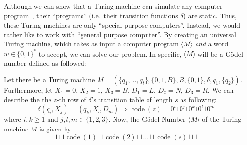\documentclass[journal]{IEEEtran}
\begin{document}

Although we can show that a Turing machine can simulate any computer program~\cite{Wegener2013:2.3}, their ``programs'' (i.e.~their transition functions $\delta$) are static. Thus, these Turing machines are only ``special purpose computers''. Instead, we would rather like to work with ``general purpose computer''. By creating an universal Turing machine, which takes as input a computer program $\langle M \rangle$ \textit{and} a word $w \in \{0, 1\}^*$ to accept, we can solve our problem. In specific, $\langle M \rangle$ will be a Gödel number defined as followed:

\begin{definition}
  Let there be a Turing machine $M = (\{q_1, \dotsc, q_t\}, \{0, 1, B\}, B, \{0, 1\}, \delta, q_1, \{q_2\})$. Furthermore, let $X_1 = 0$, $X_2 = 1$, $X_3 = B$, $D_1 = L$, $D_2 = N$, $D_3 = R$. We can describe the the $z$-th row of $\delta$'s transition table of length $s$ as following:
  \begin{equation*}
    \delta(q_i, X_j) = (q_k, X_l, D_m) \Longrightarrow \operatorname{code}(z) = 0^i 10^j 10^k 10^l 10^m
  \end{equation*}
  where $i, k \ge 1$ and $j, l, m \in \{1, 2, 3\}$. Now, the Gödel Number $\langle M \rangle$ of the Turing machine $M$ is given by
  \begin{equation*}
    111 \operatorname{code}(1) 11 \operatorname{code}(2) 11 \dotsc 11 \operatorname{code}(s) 111
  \end{equation*}
\end{definition}
\end{document}

